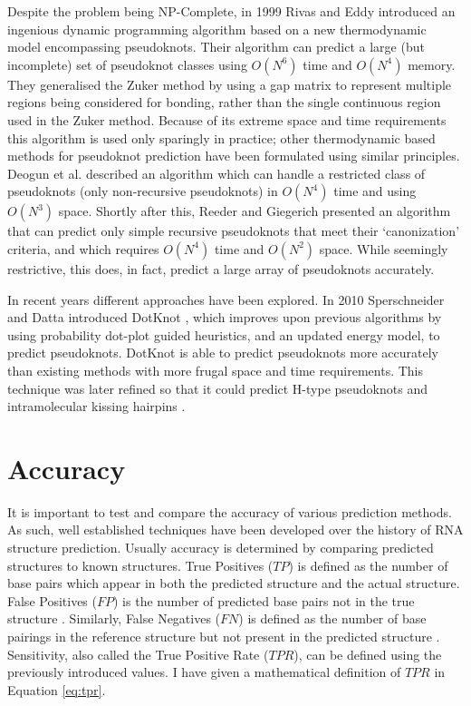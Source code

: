\documentclass{cshonours}
\begin{document}
Despite the problem being NP-Complete, in 1999 Rivas and Eddy \cite{rivas1999dynamic} introduced an ingenious dynamic
programming algorithm based on a new thermodynamic model encompassing pseudoknots. Their algorithm can predict a large (but incomplete) set of pseudoknot classes using
$O(N^6)$ time and $O(N^4)$ memory. They generalised the Zuker method by using a gap matrix to represent multiple regions being considered for bonding, rather than
the single continuous region used in the Zuker method. Because of its extreme
space and time requirements this algorithm is used only sparingly in practice; other thermodynamic based methods for pseudoknot prediction have
been formulated using similar principles. Deogun et al. \cite{deogun2004rna} described an algorithm which can handle a restricted class of pseudoknots (only non-recursive pseudoknots) in $O(N^4)$ time and using $O(N^3)$ space. Shortly after this, Reeder and Giegerich \cite{reeder2004design} presented an algorithm that can predict
only simple recursive pseudoknots that meet their `canonization' criteria, and which requires $O(N^4)$ time and $O(N^2)$ space. While
seemingly restrictive, this does, in fact, predict a large array of pseudoknots accurately. 

In recent years different approaches have been explored. In 2010 Sperschneider and Datta introduced DotKnot \cite{sperschneider2010dotknot}, which improves upon previous algorithms by using probability dot-plot guided heuristics, and an updated energy model, to predict pseudoknots. DotKnot is able to predict pseudoknots more accurately than existing methods with more frugal space and time requirements. This technique was later refined so that it could predict H-type pseudoknots and intramolecular kissing hairpins \cite{sperschneider2011heuristic}.


\section{Accuracy}
\label{sec:accuracy}
It is important to test and compare the accuracy of various prediction methods.
As such, well established techniques have been developed over
the history of RNA structure prediction. Usually accuracy is determined by comparing predicted structures to known
structures. True Positives ($TP$) is defined as the number of base pairs which appear in both the predicted structure and the actual structure. False Positives
($FP$) is the number of predicted base pairs not in the true
structure \cite{lorenz2011viennarna}. Similarly, False Negatives ($FN$) is defined as the number of base
pairings in the reference structure but not present in the predicted structure \cite{lorenz2011viennarna}.
Sensitivity, also called the True Positive Rate ($TPR$), can be defined using the previously introduced values. I have given a mathematical definition of $TPR$ in Equation \ref{eq:tpr}.
\end{document}
